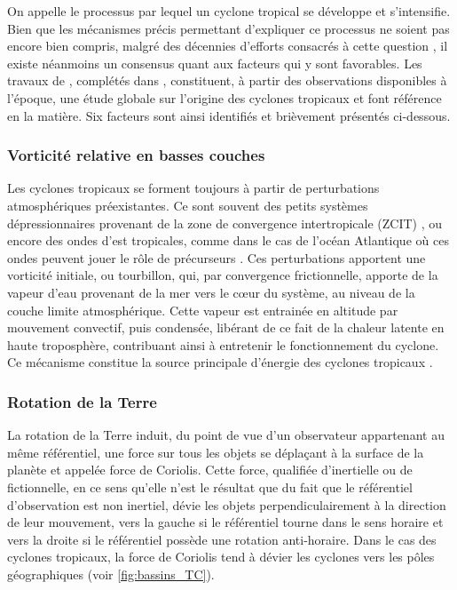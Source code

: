 \documentclass[../main.tex]{subfiles}
\begin{document}
On appelle  le processus par lequel un cyclone tropical se développe et s'intensifie. Bien que les mécanismes précis permettant
d'expliquer ce processus ne soient pas encore bien compris, malgré des décennies d'efforts consacrés à cette question \parencite{yanai_formation_1964, gray_global_1968, 
montgomery_tropical_1993, gray_formation_1998, tory_tropical_2010}, il existe néanmoins un consensus quant aux facteurs qui y sont favorables. Les travaux de
\cite{gray_global_1968}, complétés dans \cite{gray_tropical_1975}, constituent, à partir des observations disponibles à l'époque, une étude globale sur
l'origine des cyclones tropicaux et font référence en la matière. Six facteurs sont ainsi identifiés et brièvement présentés ci-dessous.

\subsubsection*{Vorticité relative en basses couches}

Les cyclones tropicaux se forment toujours à partir de perturbations atmosphériques préexistantes. Ce sont souvent des petits systèmes dépressionnaires
provenant de la zone de convergence intertropicale (ZCIT) \parencite{gray_global_1968}, ou encore des ondes d'est tropicales, comme dans le cas de l'océan
Atlantique où ces ondes peuvent jouer le rôle de précurseurs \parencite{thorncroft_african_2001,patricola_response_2018}. Ces perturbations apportent une
vorticité initiale, ou tourbillon, qui, par convergence frictionnelle, apporte de la vapeur d'eau provenant de la mer vers le cœur du système, au niveau de la
couche limite atmosphérique. Cette vapeur est entrainée en altitude par mouvement convectif, puis condensée, libérant de ce fait de la chaleur latente en haute
troposphère, contribuant ainsi à entretenir le fonctionnement du cyclone. Ce mécanisme constitue la source principale d'énergie des cyclones tropicaux
\parencite{emanuel_dependence_1987}.

\subsubsection*{Rotation de la Terre}

La rotation de la Terre induit, du point de vue d'un observateur appartenant au même référentiel, une force sur tous les objets se déplaçant à la surface de la
planète et appelée force de Coriolis. Cette force, qualifiée d'inertielle ou de fictionnelle, en ce sens qu'elle n'est le résultat que du fait que le
référentiel d'observation est non inertiel, dévie les objets perpendiculairement à la direction de leur mouvement, vers la gauche si le référentiel tourne dans
le sens horaire et vers la droite si le référentiel possède une rotation anti-horaire. Dans le cas des cyclones tropicaux, la force de Coriolis tend à dévier
les cyclones vers les pôles géographiques (voir \cref{fig:bassins_TC}).
\end{document}
